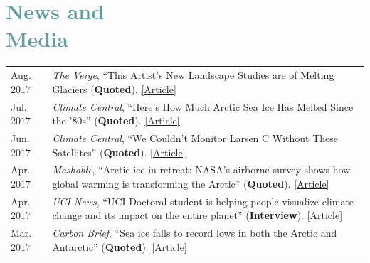 \documentclass[margin,line,palatino,courier,10pt]{res}
\begin{document}
\begin{resume}
\begin{tabular}{@{}p{2.2in}p{3in}}
\end{tabular}


\vspace{-0.1in}
\noindent\makebox[\linewidth][r]{\rule{\textwidth}{5pt}}
\vspace{-0.3in}

\section{\sc \textcolor{CadetBlue}{\large{News and\\ Media}}}
\vspace*{0.04in}
\begin{tabular}{@{}p{0.8in}p{4in}}
Aug. $2017$ & \textit{The Verge}, ``This Artist's New Landscape Studies are of Melting Glaciers (\textbf{Quoted}). \href{http://sites.uci.edu/zlabe/media-and-outreach/?preview_id=567&preview_nonce=d7dd77fe7a&_thumbnail_id=-1&preview=true}{[Article]}\\
Jul. $2017$ & \textit{Climate Central}, ``Here's How Much Arctic Sea Ice Has Melted Since the '$80$s'' (\textbf{Quoted}). \href{http://www.climatecentral.org/news/arctic-sea-ice-melt-since-the-80s-21637}{[Article]}\\
Jun. $2017$ & \textit{Climate Central}, ``We Couldn't Monitor Larsen C Without These Satellites'' (\textbf{Quoted}). \href{http://www.climatecentral.org/news/larsen-c-monitoring-satellites-21564}{[Article]}\\
Apr. $2017$ & \textit{Mashable}, ``Arctic ice in retreat: NASA's airborne survey shows how global warming is transforming the Arctic'' (\textbf{Quoted}). \href{http://mashable.com/2017/04/13/arctic-meltdown-nasa-photos-changing-ice/?utm_cid=hp-n-1#BgdepWyM6Pq3}{[Article]}\\
Apr. $2017$ & \textit{UCI News}, ``UCI Doctoral student is helping people visualize climate change and its impact on the entire planet'' (\textbf{Interview}). \href{http://grad.uci.edu/news-and-events/student-spotlights/Zachary-Labe.html}{[Article]}\\
Mar. $2017$ & \textit{Carbon Brief}, ``Sea ice falls to record lows in both the Arctic and Antarctic'' (\textbf{Quoted}). \href{https://www.carbonbrief.org/sea-ice-falls-record-lows-arctic-antarctic}{[Article]}\\

\end{tabular}
\end{resume}
\end{document}
